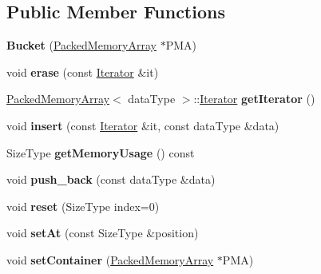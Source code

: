 \subsection*{Public Member Functions}
\begin{DoxyCompactItemize}
\item 
\hypertarget{class_packed_memory_array_1_1_bucket_aa20ee2d56b8cd6dfdc87e6914766b99b}{
{\bfseries Bucket} (\hyperlink{class_packed_memory_array}{PackedMemoryArray} $\ast$PMA)}
\label{class_packed_memory_array_1_1_bucket_aa20ee2d56b8cd6dfdc87e6914766b99b}

\item 
\hypertarget{class_packed_memory_array_1_1_bucket_a98e6fef6e285d0d09637f134c79d45fd}{
void {\bfseries erase} (const \hyperlink{class_packed_memory_array_1_1_iterator}{Iterator} \&it)}
\label{class_packed_memory_array_1_1_bucket_a98e6fef6e285d0d09637f134c79d45fd}

\item 
\hypertarget{class_packed_memory_array_1_1_bucket_a15378e02484c3987b8846edf6b975849}{
\hyperlink{class_packed_memory_array}{PackedMemoryArray}$<$ dataType $>$::\hyperlink{class_packed_memory_array_1_1_iterator}{Iterator} {\bfseries getIterator} ()}
\label{class_packed_memory_array_1_1_bucket_a15378e02484c3987b8846edf6b975849}

\item 
\hypertarget{class_packed_memory_array_1_1_bucket_a64ed69f9d7543cd69191789ed65af025}{
void {\bfseries insert} (const \hyperlink{class_packed_memory_array_1_1_iterator}{Iterator} \&it, const dataType \&data)}
\label{class_packed_memory_array_1_1_bucket_a64ed69f9d7543cd69191789ed65af025}

\item 
\hypertarget{class_packed_memory_array_1_1_bucket_af5519ca9581938eb3d0a86ee3e3e5c0c}{
SizeType {\bfseries getMemoryUsage} () const }
\label{class_packed_memory_array_1_1_bucket_af5519ca9581938eb3d0a86ee3e3e5c0c}

\item 
\hypertarget{class_packed_memory_array_1_1_bucket_acce451baa0f4ba8eaa144b202107f2b1}{
void {\bfseries push\_\-back} (const dataType \&data)}
\label{class_packed_memory_array_1_1_bucket_acce451baa0f4ba8eaa144b202107f2b1}

\item 
\hypertarget{class_packed_memory_array_1_1_bucket_a9dfdb3ffa9cc93796d7bbc882bacf6f6}{
void {\bfseries reset} (SizeType index=0)}
\label{class_packed_memory_array_1_1_bucket_a9dfdb3ffa9cc93796d7bbc882bacf6f6}

\item 
\hypertarget{class_packed_memory_array_1_1_bucket_a445de3cfaaf8e0a0f542ef6ffb6a25fe}{
void {\bfseries setAt} (const SizeType \&position)}
\label{class_packed_memory_array_1_1_bucket_a445de3cfaaf8e0a0f542ef6ffb6a25fe}

\item 
\hypertarget{class_packed_memory_array_1_1_bucket_ab3f55247213754a03369c7489bfb121d}{
void {\bfseries setContainer} (\hyperlink{class_packed_memory_array}{PackedMemoryArray} $\ast$PMA)}
\label{class_packed_memory_array_1_1_bucket_ab3f55247213754a03369c7489bfb121d}

\end{DoxyCompactItemize}
